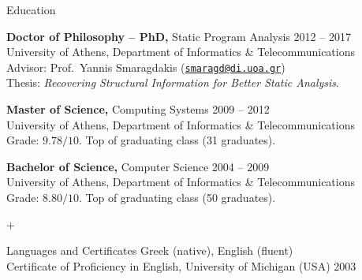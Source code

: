 \documentclass{resume}
\begin{document}

\begin{rSection}{Education}

{\bf Doctor of Philosophy -- PhD,} Static Program Analysis \hfill {2012 -- 2017} \\
University of Athens, Department of Informatics \& Telecommunications \\
Advisor: Prof.~Yannis Smaragdakis
(\href{smaragd@di.uoa.gr}{\nolinkurl{smaragd@di.uoa.gr}}) \\
Thesis: \emph{Recovering Structural Information for Better Static Analysis}.

{\bf Master of Science,} Computing Systems \hfill {2009 -- 2012} \\
University of Athens, Department of Informatics \& Telecommunications \\
Grade: $9.78 / 10$. Top of graduating class (31 graduates).

{\bf Bachelor of Science,} Computer Science \hfill {2004 -- 2009}  \\
University of Athens, Department of Informatics \& Telecommunications \\
Grade: $8.80 / 10$. Top of graduating class (\mytilde{}50 graduates).

+\end{rSection}

\newpage

\begin{rSection}{Languages and Certificates}
  Greek (native), English (fluent) \\
  Certificate of Proficiency in English, University of Michigan (USA)
  \hfill 2003
\end{rSection}

\end{document}
